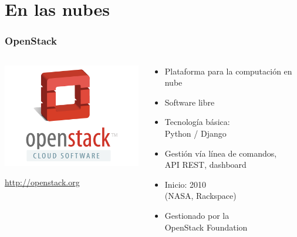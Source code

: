 %
%

\section{En las nubes}

\begin{frame}
\frametitle{OpenStack}

\begin{columns}[T]
\begin{column}{.38\textwidth}
\includegraphics[width=6.5cm]{figs/openstack-logo}

\begin{flushright}
\url{http://openstack.org}
\end{flushright}

\end{column}%
\hfill%
\begin{column}{.60\textwidth}
{\Large
\begin{itemize}
\item Plataforma para la computación en nube
\item Software libre
\item Tecnología básica: \\
  Python / Django
\item Gestión vía línea de comandos, \\
  API REST, dashboard
\item Inicio: 2010 \\
  (NASA, Rackspace)
\item Gestionado por la \\
  OpenStack Foundation
\end{itemize}
}
\end{column}%
\end{columns}

\end{frame}

